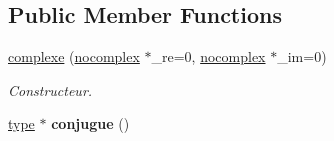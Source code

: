 \subsection*{Public Member Functions}
\begin{DoxyCompactItemize}
\item 
\hyperlink{classcomplexe_adc78653349f4c9d9c649fcc3dd40ee41}{complexe} (\hyperlink{classnocomplex}{nocomplex} $\ast$\-\_\-re=0, \hyperlink{classnocomplex}{nocomplex} $\ast$\-\_\-im=0)
\begin{DoxyCompactList}\small\item\em Constructeur. \end{DoxyCompactList}\item 
\hypertarget{classcomplexe_a2f8b146111837f4b2f60e704ee6e0632}{\hyperlink{classtype}{type} $\ast$ {\bfseries conjugue} ()}\label{classcomplexe_a2f8b146111837f4b2f60e704ee6e0632}


\end{DoxyCompactItemize}
